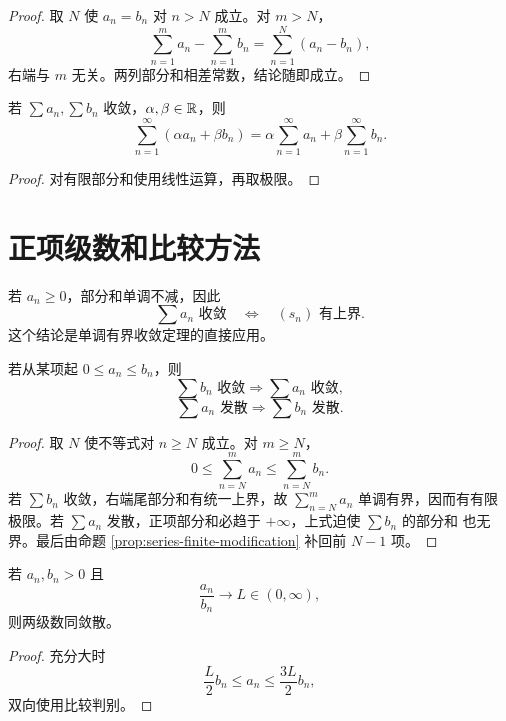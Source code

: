 \begin{proof}
取 \(N\) 使 \(a_n=b_n\) 对 \(n>N\) 成立。对 \(m>N\)，
\[
 \sum_{n=1}^m a_n-\sum_{n=1}^m b_n
 =\sum_{n=1}^N(a_n-b_n),
\]
右端与 \(m\) 无关。两列部分和相差常数，结论随即成立。
\end{proof}

\begin{proposition}[线性运算]
若 \(\sum a_n,\sum b_n\) 收敛，\(\alpha,\beta\in\mathbb{R}\)，则
\[
 \sum_{n=1}^\infty(\alpha a_n+\beta b_n)
 =\alpha\sum_{n=1}^\infty a_n+\beta\sum_{n=1}^\infty b_n.
\]
\end{proposition}

\begin{proof}
对有限部分和使用线性运算，再取极限。
\end{proof}

\section{正项级数和比较方法}

若 \(a_n\ge0\)，部分和单调不减，因此
\[
 \sum a_n\text{ 收敛}
\quad\Longleftrightarrow\quad
(s_n)\text{ 有上界}.
\]
这个结论是单调有界收敛定理的直接应用。

\begin{theorem}[比较判别]
\label{thm:series-comparison}
若从某项起 \(0\le a_n\le b_n\)，则
\[
 \sum b_n\text{ 收敛}\Longrightarrow\sum a_n\text{ 收敛},
\]
\[
 \sum a_n\text{ 发散}\Longrightarrow\sum b_n\text{ 发散}.
\]
\end{theorem}

\begin{proof}
取 \(N\) 使不等式对 \(n\ge N\) 成立。对 \(m\ge N\)，
\[
 0\le\sum_{n=N}^m a_n\le\sum_{n=N}^m b_n.
\]
若 \(\sum b_n\) 收敛，右端尾部分和有统一上界，故
\(\sum_{n=N}^m a_n\) 单调有界，因而有有限极限。若 \(\sum a_n\)
发散，正项部分和必趋于 \(+\infty\)，上式迫使 \(\sum b_n\) 的部分和
也无界。最后由命题 \ref{prop:series-finite-modification} 补回前 \(N-1\)
项。
\end{proof}

\begin{theorem}[极限比较]
\label{thm:series-limit-comparison}
若 \(a_n,b_n>0\) 且
\[
 \frac{a_n}{b_n}\to L\in(0,\infty),
\]
则两级数同敛散。
\end{theorem}

\begin{proof}
充分大时
\[
 \frac L2 b_n\le a_n\le\frac{3L}{2}b_n,
\]
双向使用比较判别。
\end{proof}

